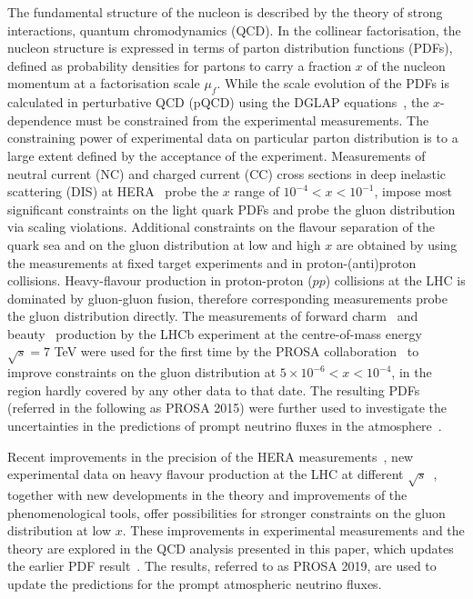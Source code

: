 \documentclass[12pt]{article}
\begin{document}
The fundamental structure of the nucleon is described by the theory of strong interactions, quantum chromodynamics (QCD).
In the collinear factorisation, the nucleon structure is expressed in terms of parton distribution functions (PDFs), defined 
as probability densities for partons to carry a fraction $x$ of the nucleon momentum at a factorisation scale $\mu_f$. While the 
scale evolution of the PDFs is calculated in perturbative QCD (pQCD) using the DGLAP equations~\cite{Dokshitzer:1977sg,Gribov:1972ri,Altarelli:1977zs,Curci:1980uw,Furmanski:1980cm,Moch:2004pa,Vogt:2004mw}, the 
$x$-dependence must be constrained from the experimental measurements. The constraining power of experimental data 
on particular parton distribution is to a large extent defined by the acceptance of the experiment. Measurements of 
neutral current (NC) and charged current (CC) cross sections in deep inelastic scattering (DIS) at HERA~\cite{Abramowicz:2015mha} probe the $x$ range of $10^{-4}<x<10^{-1}$, impose most significant constraints on the light quark PDFs and probe the gluon distribution via scaling violations. Additional constraints on the flavour separation of the quark sea and on the gluon distribution at low and high $x$ are obtained by using the measurements at fixed target experiments and in proton-(anti)proton collisions. Heavy-flavour production in proton-proton ($pp$) collisions at the LHC is dominated by gluon-gluon fusion, therefore corresponding measurements probe the gluon distribution directly. The measurements of forward charm~\cite{Aaij:2013mga} and beauty~\cite{Aaij:2013noa} production by the LHCb experiment at the centre-of-mass energy $\sqrt{s}=7$ TeV were used for the first time by the PROSA collaboration~\cite{Zenaiev:2015rfa} to improve constraints on the gluon distribution at $5 \times 10^{-6}< x < 10^{-4}$, in the region hardly covered by any other data to that date. The resulting PDFs (referred in the following as PROSA 2015) were further used to investigate the uncertainties in the predictions of prompt neutrino fluxes in the atmosphere~\cite{Garzelli:2016xmx}.       

Recent improvements in the precision of the HERA measurements~\cite{Abramowicz:2015mha,H1:2018flt}, new experimental data on heavy flavour production at the LHC at 
different $\sqrt{s}$~\cite{Aaij:2015bpa,Aaij:2016jht,Acharya:2017jgo,Acharya:2019mgn}, together with new developments in the theory and improvements of the phenomenological tools, offer 
possibilities for stronger constraints on the gluon distribution at low $x$. These improvements in experimental measurements 
and the theory are explored in the QCD analysis presented in this paper, which updates the earlier PDF result~\cite{Zenaiev:2015rfa}. The results, referred to as PROSA 2019, are used to update the predictions for the prompt atmospheric neutrino fluxes. 
\end{document}
